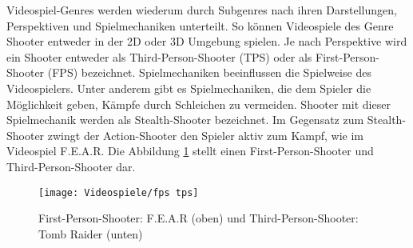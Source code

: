 Videospiel-Genres werden wiederum durch Subgenres nach ihren Darstellungen, Perspektiven und Spielmechaniken unterteilt. So k\"{o}nnen Videospiele des Genre Shooter entweder in der 2D oder 3D Umgebung spielen. Je nach Perspektive wird ein Shooter entweder als Third-Person-Shooter (TPS) oder als First-Person-Shooter (FPS) bezeichnet. Spielmechaniken beeinflussen die Spielweise des Videospielers. Unter anderem gibt es Spielmechaniken, die dem Spieler die M\"{o}glichkeit geben, K\"{a}mpfe durch Schleichen zu vermeiden. Shooter mit dieser Spielmechanik werden als Stealth-Shooter bezeichnet. Im Gegensatz zum Stealth-Shooter zwingt der Action-Shooter den Spieler aktiv zum Kampf, wie im Videospiel F.E.A.R. Die Abbildung \ref{fig:fps tps} stellt einen First-Person-Shooter und Third-Person-Shooter dar.

\begin{figure}[h]
  \centering
  \texttt{[image: Videospiele/fps tps]}
	\captionsetup{justification=justified, format=plain}
  \caption{First-Person-Shooter: F.E.A.R (oben) und Third-Person-Shooter: Tomb Raider (unten)}
  \label{fig:fps tps}
\end{figure}


